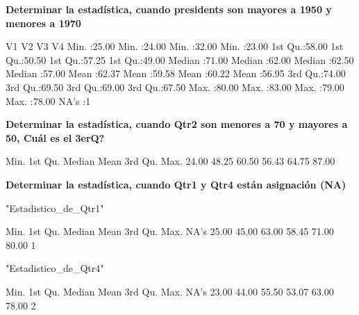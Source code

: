 \documentclass[10pt]{report}
\begin{document}
\textbf{Determinar la estadística, cuando presidents son mayores a 1950 y menores a 1970}\\
\begin{Schunk}
\begin{Soutput}
       V1              V2              V3              V4       
 Min.   :25.00   Min.   :24.00   Min.   :32.00   Min.   :23.00  
 1st Qu.:58.00   1st Qu.:50.50   1st Qu.:57.25   1st Qu.:49.00  
 Median :71.00   Median :62.00   Median :62.50   Median :57.00  
 Mean   :62.37   Mean   :59.58   Mean   :60.22   Mean   :56.95  
 3rd Qu.:74.00   3rd Qu.:69.50   3rd Qu.:69.00   3rd Qu.:67.50  
 Max.   :80.00   Max.   :83.00   Max.   :79.00   Max.   :78.00  
                                 NA's   :1                      
\end{Soutput}
\end{Schunk}

\textbf{Determinar la estadística, cuando Qtr2 son menores a 70 y mayores a 50, Cuál es el 3erQ?}\\
\begin{Schunk}
\begin{Soutput}
   Min. 1st Qu.  Median    Mean 3rd Qu.    Max. 
  24.00   48.25   60.50   56.43   64.75   87.00 
\end{Soutput}
\end{Schunk}

\textbf{Determinar la estadística, cuando Qtr1 y Qtr4 están asignación (NA)}\\
\begin{Schunk}
\begin{Soutput}
[1] "Estadistico_de_Qtr1"
\end{Soutput}
\begin{Soutput}
   Min. 1st Qu.  Median    Mean 3rd Qu.    Max.    NA's 
  25.00   45.00   63.00   58.45   71.00   80.00       1 
\end{Soutput}
\begin{Soutput}
[1] "Estadistico_de_Qtr4"
\end{Soutput}
\begin{Soutput}
   Min. 1st Qu.  Median    Mean 3rd Qu.    Max.    NA's 
  23.00   44.00   55.50   53.07   63.00   78.00       2 
\end{Soutput}
\end{Schunk}
\end{document}
